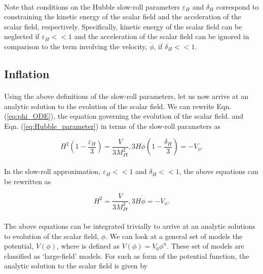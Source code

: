\documentclass[12pt,a4paper,oneside]{book}
\begin{document}
\paragraph*{} Note that conditions on the Hubble slow-roll parameters $\varepsilon_H$ and $\delta_H$ 
correspond to constraining the kinetic energy of the scalar field and the acceleration of the scalar field, 
respectively. Specifically, kinetic energy of the scalar field can be neglected if $\varepsilon_H<<1$ and 
the acceleration of the scalar field can be ignored in comparison to the term involving the 
velocity, $\dot{\phi}$, if $\delta_H<<1$.

\subsection{Inflation}

\paragraph*{} Using the above definitions of the slow-roll parameters, let us now arrive at an 
analytic solution to the evolution of the scalar field. We can rewrite Eqn. (\ref{eq:phi_ODE}), 
the equation governing the evolution of the scalar field. and Eqn. (\ref{eq:Hubble_parameter}) 
in terms of the slow-roll parameters as 

\begin{equation}
H^2\left(1-\frac{\varepsilon_H}{3}\right) = \frac{V}{3M_{Pl}^2},
3H\dot{\phi}\left(1-\frac{\delta_H}{3}\right) = -V_{\phi}.
\end{equation}

\paragraph*{} In the slow-roll approximation, $\varepsilon_H<<1$ and $\delta_H<<1$, 
the above equations can be rewritten as 

\begin{equation}
H^2 = \frac{V}{3M_{Pl}^2},
3H\dot{\phi} = -V_{\phi}.
\end{equation}

\paragraph*{} The above equations can be integrated trivially to arrive at an analytic 
solutions to evolution of the scalar field, $\phi$. We can look at a general set of models 
the potential, $V(\phi)$, where is defined as $V(\phi) = V_0\phi^n$. These set of models 
are classified as `large-field' models. For such as form of the potential function, the 
analytic solution to the scalar field is given by 
\end{document}
